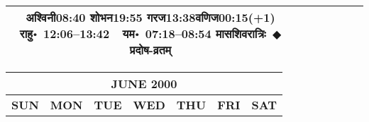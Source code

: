 \documentclass[a3paper,12pt,landscape]{article}
\newcommand{\eventsep}{~$\Diamondblack$ }
\newcommand{\To}{\hspace{1pt}\raisebox{0pt}{\tiny\RIGHTarrow}\hspace{1pt}}
\newcommand{\rahuyama}[2]{%
{राहु॰~\textsf{#1}~~यम॰~\textsf{#2}}
}
\begin{document}
\begin{center}
\begin{tabular}{|c|c|c|c|c|c|c|}
{{\mbox{अश्विनी\To{}\textsf{08:40\hspace{2ex}}}}%
{\mbox{शोभन\To{}\textsf{19:55\hspace{2ex}}}}%
{\mbox{गरज\To{}\textsf{13:38\hspace{2ex}}}\mbox{वणिज\To{}\textsf{00:15(+1)\hspace{2ex}}}}}%
{\rahuyama{12:06--13:42}{07:18--08:54}}%
{मासशिवरात्रिः\eventsep प्रदोष-व्रतम्}
&
\mbox{}  & %
\mbox{}  & %
\\ \hline
\end{tabular}



\begin{tabular}{|c|c|c|c|c|c|c|}
\multicolumn{7}{c}{\Large \bfseries \sffamily JUNE 2000}\\[3mm]
\hline
\textbf{\textsf{SUN}} & \textbf{\textsf{MON}} & \textbf{\textsf{TUE}} & \textbf{\textsf{WED}} & \textbf{\textsf{THU}} & \textbf{\textsf{FRI}} & \textbf{\textsf{SAT}} \\ \hline


\end{tabular}
\end{center}
\end{document}
